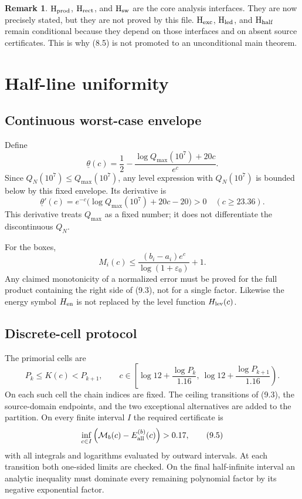 \documentclass[11pt]{article}
\theoremstyle{definition}
\newtheorem{remark}[theorem]{Remark}
\newcommand{\eps}{\varepsilon}
\begin{document}
\begin{remark}
\(\mathrm{H}_{\rm prod}\), \(\mathrm{H}_{\rm rect}\), and
\(\mathrm{H}_{\rm sw}\) are the core analysis interfaces.  They are now
precisely stated, but they are not proved by this file.  \(\mathrm{H}_{\rm
exc}\), \(\mathrm{H}_{\rm led}\), and \(\mathrm{H}_{\rm half}\) remain
conditional because they depend on those interfaces and on absent source
certificates.  This is why (8.5) is not promoted to an unconditional
main theorem.

\end{remark}

\section{Half-line uniformity}
\label{sec:halfline}

\subsection{Continuous worst-case envelope}
\label{sec:continuous-envelope}

Define
\[
 \underline\theta(c)=
 \frac12-\frac{\log Q_{\max}(10^7)+20c}{e^c}.
\tag{9.1}
\]
Since \(Q_N(10^7)\le Q_{\max}(10^7)\), any level expression with
\(Q_N(10^7)\) is bounded below by this fixed envelope.  Its derivative is
\[
 \underline\theta'(c)=e^{-c}
 \bigl(\log Q_{\max}(10^7)+20c-20\bigr)>0
\quad(c\ge23.36).
\tag{9.2}
\]
This derivative treats \(Q_{\max}\) as a fixed number; it does not
differentiate the discontinuous \(Q_N\).

For the boxes,
\[
 M_i(c)\le
 \frac{(b_i-a_i)e^c}{\log(1+\eps_0)}+1.
\tag{9.3}
\]
Any claimed monotonicity of a normalized error must be proved for the full
product containing the right side of (9.3), not for a single factor.
Likewise the energy symbol \(H_{\rm en}\) is not replaced by the level
function \(H_{\rm lev}(c)\).

\subsection{Discrete-cell protocol}
\label{sec:cell-protocol}

The primorial cells are
\[
 P_k\le K(c)<P_{k+1},\qquad
 c\in\left[
 \log12+\frac{\log P_k}{1.16},\
 \log12+\frac{\log P_{k+1}}{1.16}
 \right).
\tag{9.4}
\]
On each such cell the chain indices are fixed.  The ceiling transitions
of (9.3), the source-domain endpoints, and the two exceptional alternatives
are added to the partition.  On every finite interval \(I\) the required
certificate is
\[
 \inf_{c\in I}
 \left(\mathcal M_b(c)-E_{\rm all}^{(b)}(c)\right)>0.17,
\tag{9.5}
\]
with all integrals and logarithms evaluated by outward intervals.  At each
transition both one-sided limits are checked.  On the final half-infinite
interval an analytic inequality must dominate every remaining polynomial
factor by its negative exponential factor.
\end{document}
